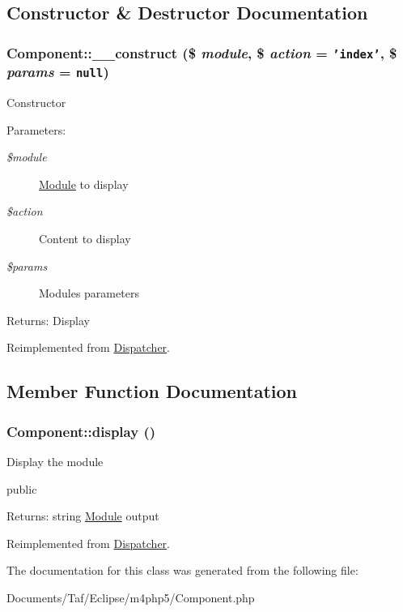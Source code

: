 \subsection{Constructor \& Destructor Documentation}
\hypertarget{classComponent_941aa95779d197b421b80d79a689da80}{
\subsubsection[\_\-\_\-construct]{\setlength{\rightskip}{0pt plus 5cm}Component::\_\-\_\-construct (\$ {\em module}, \/  \$ {\em action} = {\tt 'index'}, \/  \$ {\em params} = {\tt null})}}
\label{classComponent_941aa95779d197b421b80d79a689da80}


Constructor

\begin{Desc}
\item[Parameters:]
\begin{description}
\item[{\em \$module}]\hyperlink{classModule}{Module} to display \item[{\em \$action}]Content to display \item[{\em \$params}]Modules parameters \end{description}
\end{Desc}
\begin{Desc}
\item[Returns:]Display \end{Desc}


Reimplemented from \hyperlink{classDispatcher_d9596c149149dc310c56d6b8dea95474}{Dispatcher}.

\subsection{Member Function Documentation}
\hypertarget{classComponent_0a0409f0dc2092c2aa383123f98ca09c}{
\subsubsection[display]{\setlength{\rightskip}{0pt plus 5cm}Component::display ()}}
\label{classComponent_0a0409f0dc2092c2aa383123f98ca09c}


Display the module

public \begin{Desc}
\item[Returns:]string \hyperlink{classModule}{Module} output \end{Desc}


Reimplemented from \hyperlink{classDispatcher_92a054ab35b0d91267d80da16d53ef9e}{Dispatcher}.

The documentation for this class was generated from the following file:\begin{CompactItemize}
\item 
Documents/Taf/Eclipse/m4php5/Component.php\end{CompactItemize}
